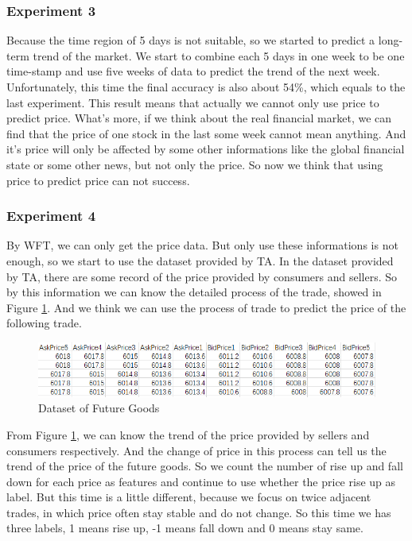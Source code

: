 \subsubsection{Experiment 3}
Because the time region of 5 days is not suitable, so we started to predict a long-term trend of the market. We start to combine each 5 days in one week to be one time-stamp and use five weeks of data to predict the trend of the next week. Unfortunately, this time the final accuracy is also about 54\%, which equals to the last experiment. This result means that actually we cannot only use price to predict price. What's more, if we think about the real financial market, we can find that the price of one stock in the last some week cannot mean anything. And it's price will only be affected by some other informations like the global financial state or some other news, but not only the price. So now we think that using price to predict price can not success.

\subsubsection{Experiment 4}
By WFT, we can only get the price data. But only use these informations is not enough, so we start to use the dataset provided by TA. In the dataset provided by TA, there are some record of the price provided by consumers and sellers. So by this information we can know the detailed process of the trade, showed in Figure \ref{fig:luowen1}. And we think we can use the process of trade to predict the price of the following trade.

\begin{figure}
\centering
\includegraphics[width=1.0\textwidth]{luowen1.png}
\caption{\label{fig:luowen1}Dataset of Future Goods}
\end{figure}

From Figure \ref{fig:luowen1}, we can know the trend of the price provided by sellers and consumers respectively. And the change of price in this process can tell us the trend of the price of the future goods. So we count the number of rise up and fall down for each price as features and continue to use whether the price rise up as label. But this time is a little different, because we focus on twice adjacent trades, in which price often stay stable and do not change. So this time we has three labels, 1 means rise up, -1 means fall down and 0 means stay same. 


